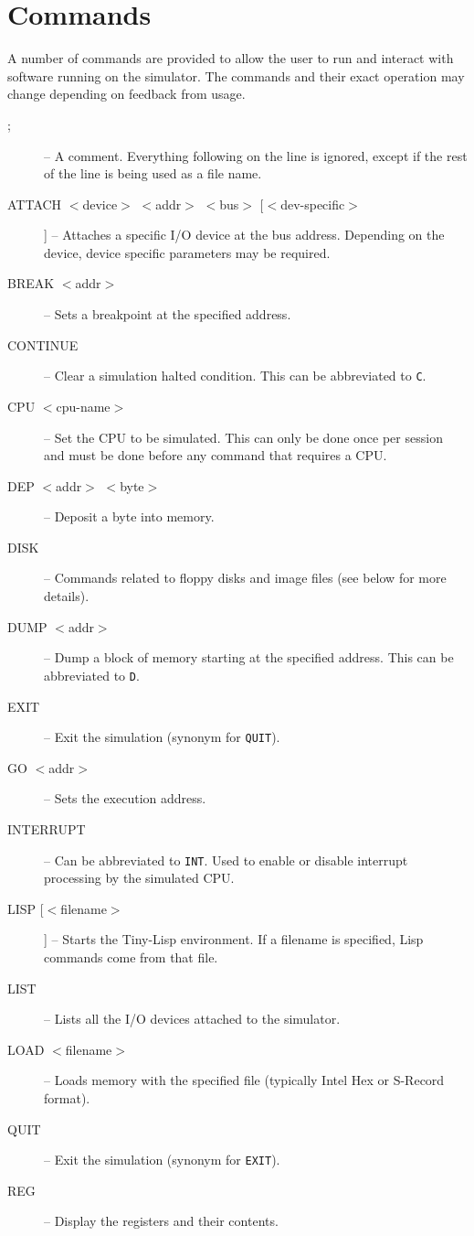 \documentclass[10pt, openany]{book}
\begin{document}
\section{Commands}
A number of commands are provided to allow the user to run and interact with software running on the simulator.  The commands and their exact operation may change depending on feedback from usage.
\begin{description}
  \item[;] -- A comment.  Everything following on the line is ignored, except if the rest of the line is being used as a file name.
  \item[ATTACH $<$device$>$ $<$addr$>$ $<$bus$>$ [$<$dev-specific$>$]] --  Attaches a specific I/O device at the bus address.  Depending on the device, device specific parameters may be required.
  \item[BREAK $<$addr$>$] -- Sets a breakpoint at the specified address.
  \item[CONTINUE] -- Clear a simulation halted condition.  This can be abbreviated to \verb|C|.
  \item[CPU $<$cpu-name$>$] -- Set the CPU to be simulated.  This can only be done once per session and must be done before any command that requires a CPU.
  \item[DEP $<$addr$>$ $<$byte$>$] -- Deposit a byte into memory.
  \item[DISK]  --  Commands related to floppy disks and image files (see below for more details).
  \item[DUMP $<$addr$>$] -- Dump a block of memory starting at the specified address.  This can be abbreviated to \verb|D|.
  \item[EXIT] -- Exit the simulation (synonym for \verb|QUIT|).
  \item[GO $<$addr$>$] -- Sets the execution address.
  \item[INTERRUPT]-- Can be abbreviated to \verb|INT|.  Used to enable or disable interrupt processing by the simulated CPU.
  \item[LISP [$<$filename$>$]] -- Starts the Tiny-Lisp environment.  If a filename is specified, Lisp commands come from that file.
  \item[LIST] -- Lists all the I/O devices attached to the simulator.
  \item[LOAD $<$filename$>$] -- Loads memory with the specified file (typically Intel Hex or S-Record format).
  \item[QUIT] -- Exit the simulation (synonym for \verb|EXIT|).
  \item[REG] -- Display the registers and their contents.

\end{description}
\end{document}
